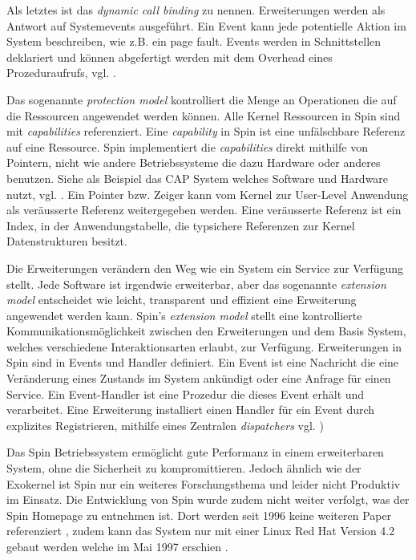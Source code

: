 \documentclass[german, 9pt,technote]{IEEEtran}
\begin{document}
      Als letztes ist das \textit{dynamic call binding} zu nennen. Erweiterungen werden als Antwort auf Systemevents ausgef\"uhrt.
      Ein Event kann jede potentielle Aktion im System beschreiben, wie z.B. ein page fault. Events werden in Schnittstellen deklariert
      und k\"onnen abgefertigt werden mit dem Overhead eines Prozeduraufrufs, vgl. \cite[S. 267 f]{inproc:spin}.
      
      Das sogenannte \textit{protection model} kontrolliert die Menge an Operationen die auf die Ressourcen angewendet werden k\"onnen.
      Alle Kernel Ressourcen in Spin sind mit \textit{capabilities} referenziert. 
      Eine \textit{capability} in Spin ist eine unf\"alschbare Referenz auf eine Ressource.
      Spin implementiert die \textit{capabilities} direkt mithilfe von Pointern, nicht wie andere Betriebssysteme die dazu Hardware oder anderes benutzen.
      Siehe als Beispiel das CAP System welches Software und Hardware nutzt, vgl. \cite{inproc:cap}.
      Ein Pointer bzw. Zeiger kann vom Kernel zur User-Level Anwendung als ver\"ausserte Referenz weitergegeben werden.
      Eine ver\"ausserte Referenz ist ein Index, in der Anwendungstabelle, die typsichere Referenzen zur Kernel Datenstrukturen besitzt.
      
      Die Erweiterungen ver\"andern den Weg wie ein System ein Service zur Verf\"ugung stellt. Jede Software ist irgendwie erweiterbar, 
      aber das sogenannte \textit{extension model} entscheidet wie leicht, transparent und effizient eine Erweiterung angewendet werden kann. 
      Spin's \textit{extension model} stellt eine kontrollierte Kommunikationsm\"oglichkeit zwischen den Erweiterungen und dem Basis System,
      welches verschiedene Interaktionsarten erlaubt, zur Verf\"ugung.
      Erweiterungen in Spin sind in Events und Handler definiert. Ein Event ist eine Nachricht die eine Ver\"anderung eines Zustands im System ank\"undigt
      oder eine Anfrage f\"ur einen Service. Ein Event-Handler ist eine Prozedur die dieses Event erh\"alt und verarbeitet. 
      Eine Erweiterung installiert einen Handler f\"ur ein Event durch explizites Registrieren, mithilfe eines Zentralen
      \textit{dispatchers} vgl. \cite[S. 272]{inproc:spin})
      
      Das Spin Betriebssystem erm\"oglicht gute Performanz in einem erweiterbaren System, ohne die Sicherheit zu kompromittieren.
      Jedoch \"ahnlich wie der Exokernel ist Spin nur ein weiteres Forschungsthema und leider nicht Produktiv im Einsatz.
      Die Entwicklung von Spin wurde zudem nicht weiter verfolgt, was der Spin Homepage zu entnehmen ist.
      Dort werden seit 1996 keine weiteren Paper referenziert \cite{Url:spin:papers}, zudem kann das System nur mit einer Linux Red Hat Version 4.2 
      gebaut werden welche im Mai 1997 erschien \cite{Url:spin:distro}.
      
\end{document}

